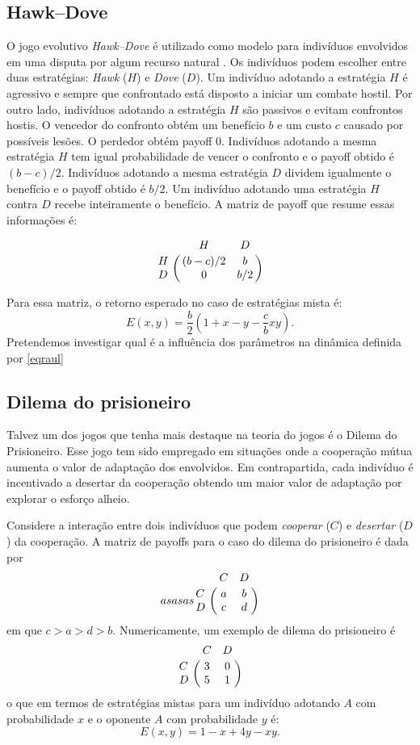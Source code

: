 \documentclass[
	12pt,				%
	openany,			%
	oneoside,			%
	a4paper,			%
	english,			%
	spanish,			%
	brazil,				%
	]{abntex2}
\begin{document}
\subsection{Hawk--Dove}
O jogo evolutivo \textit{Hawk--Dove} é utilizado como modelo para indivíduos envolvidos em uma disputa por algum recurso natural \cite{cccnature}. Os indivíduos podem escolher entre duas estratégias: \textit{Hawk} ($H$) e \textit{Dove} ($D$). Um indivíduo adotando a estratégia $H$ é agressivo e sempre que confrontado está disposto a iniciar um combate hostil. Por outro lado, indivíduos adotando a estratégia $H$ são passivos e evitam confrontos hostis. O vencedor do confronto obtém um benefício $b$ e um custo $c$ causado por possíveis lesões. O perdedor obtém payoff $0.$ Indivíduos adotando a mesma estratégia  $H$ tem igual probabilidade de vencer o confronto e o payoff obtido é $(b-c)/2.$ Indivíduos adotando a mesma estratégia  $D$ dividem igualmente o benefício e o payoff obtido é $b/2.$ Um indivíduo adotando uma estratégia $H$ contra $D$  recebe inteiramente o benefício. A matriz de payoff que resume essas informações é:

$$\bordermatrix{
&H&D\cr
H&(b-c)/2& b \cr
D &0&b/2
}$$

Para essa matriz, o retorno esperado no caso de estratégias mista é: $$E(x,y)=\frac{b}{2}\left(1+x-y-\frac{c}{b}xy\right).$$ 
Pretendemos investigar qual é a influência dos parâmetros na dinâmica definida por \ref{eqraul}  
\subsection{Dilema do prisioneiro}
Talvez um dos jogos que tenha mais destaque na teoria do jogos é o Dilema do Prisioneiro. Esse jogo tem sido empregado em situações onde a cooperação mútua aumenta o valor de adaptação dos envolvidos. Em contrapartida, cada indivíduo é incentivado a desertar da cooperação obtendo um maior valor de adaptação por explorar o esforço alheio.

Considere a interação entre dois indivíduos  que podem \textit{cooperar} ($C$) e \textit{desertar} ($D$) da cooperação. A matriz de payoffs para o caso do dilema do prisioneiro é dada por 
$$asasas \bordermatrix{
&C&D\cr
C&a& b \cr
D &c&d
}$$ 
 em que $c>a>d>b.$ Numericamente, um exemplo de dilema do prisioneiro é $$\bordermatrix{
&C&D\cr
C&3& 0 \cr
D &5&1
}$$  o que em termos de estratégias mistas para um indivíduo adotando $A$ com probabilidade $x$ e o oponente $A$ com probabilidade $y$ é: 
$$E(x,y)=1-x+4y-xy.$$ 
\end{document}
